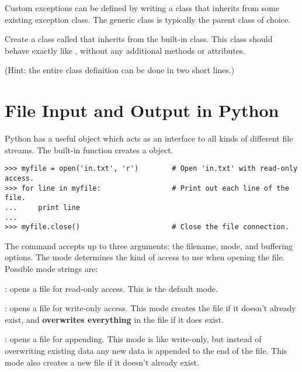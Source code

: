 Custom exceptions can be defined by writing a class that inherits from some existing exception class.
The generic  class is typically the parent class of choice.

\begin{problem}
Create a class called  that inherits from the built-in  class.
This class should behave exactly like , without any additional methods or attributes.

(Hint: the entire class definition can be done in two short lines.)
\end{problem}


\section*{File Input and Output in Python}

Python has a useful  object which acts as an interface to all kinds of different file streams.
The built-in function  creates a  object.

\begin{lstlisting}
>>> myfile = open('in.txt', 'r')        # Open 'in.txt' with read-only access.
>>> for line in myfile:                 # Print out each line of the file.
...     print line
...
>>> myfile.close()                      # Close the file connection.
\end{lstlisting}

The  command accepts up to three arguments: the filename, mode, and buffering options.
The mode determines the kind of access to use when opening the file.
Possible mode strings are:
\begin{description}
\item {}: opens a file for read-only access.
This is the default mode.
\item {}: opens a file for write-only access.
This mode creates the file if it doesn't already exist, and \textbf{overwrites everything} in the file if it does exist.
\item {}: opens a file for appending.
This mode is like write-only, but instead of overwriting existing data any new data is appended to the end of the file.
This mode also creates a new file if it doesn't already exist.
\end{description}


